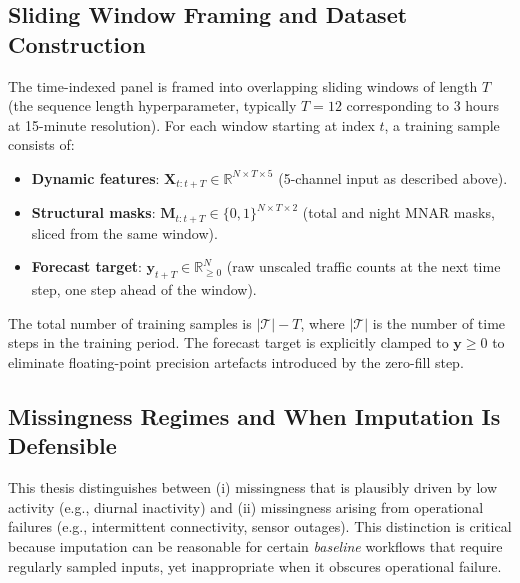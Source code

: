 \subsection{Sliding Window Framing and Dataset Construction}
\label{subsec:meth-sliding-window}

The time-indexed panel is framed into overlapping sliding windows of length $T$ (the sequence length hyperparameter, typically $T = 12$ corresponding to 3 hours at 15-minute resolution). For each window starting at index $t$, a training sample consists of:

\begin{itemize}
    \item \textbf{Dynamic features}: $\mathbf{X}_{t:t+T} \in \mathbb{R}^{N \times T \times 5}$ (5-channel input as described above).
    \item \textbf{Structural masks}: $\mathbf{M}_{t:t+T} \in \{0,1\}^{N \times T \times 2}$ (total and night MNAR masks, sliced from the same window).
    \item \textbf{Forecast target}: $\mathbf{y}_{t+T} \in \mathbb{R}_{\geq 0}^{N}$ (raw unscaled traffic counts at the next time step, one step ahead of the window).
\end{itemize}

\noindent The total number of training samples is $|\mathcal{T}| - T$, where $|\mathcal{T}|$ is the number of time steps in the training period. The forecast target is explicitly clamped to $\mathbf{y} \geq 0$ to eliminate floating-point precision artefacts introduced by the zero-fill step.

\subsection{Missingness Regimes and When Imputation Is Defensible}
\label{subsec:meth-missingness-regimes}

This thesis distinguishes between (i) missingness that is plausibly driven by low activity (e.g., diurnal inactivity) and (ii) missingness arising from operational failures (e.g., intermittent connectivity, sensor outages). This distinction is critical because imputation can be reasonable for certain \emph{baseline} workflows that require regularly sampled inputs, yet inappropriate when it obscures operational failure.

